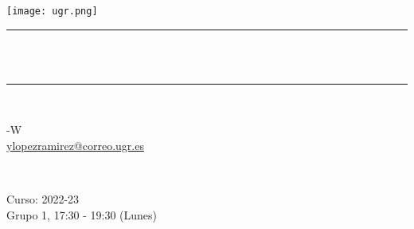 \begin{titlepage}
	\centering
	\texttt{[image: ugr.png]}\\[1.0 cm]
	\rule{\linewidth}{0.2 mm} \\[0.4 cm]
	{ \huge \bfseries \thetitle}\\
	\rule{\linewidth}{0.2 mm} \\[1.5 cm]
	
	\begin{minipage}{0.5\textwidth}
		\begin{flushleft} \large
			-W \\
			\href{mailto:ylopezramirez@correo.ugr.es}{ylopezramirez@correo.ugr.es}
		\end{flushleft}
	\end{minipage}~
	\begin{minipage}{0.5\textwidth}
		\begin{flushright} \large
			Curso: 2022-23 \\
			Grupo 1, 17:30 - 19:30 (Lunes)                   
		\end{flushright}
	\end{minipage}\\[1 cm]
	
	{\small \thedate}\\[1 cm]
	
	\vfill
	
\end{titlepage}